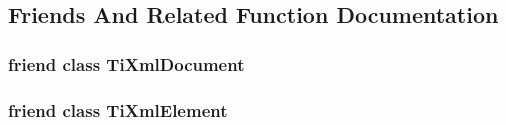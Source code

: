 \subsection{Friends And Related Function Documentation}
\hypertarget{class_ti_xml_node_a173617f6dfe902cf484ce5552b950475}{
\subsubsection[{Ti\+Xml\+Document}]{\setlength{\rightskip}{0pt plus 5cm}friend class {\bf Ti\+Xml\+Document}\hspace{0.3cm}{\ttfamily [friend]}}}\label{class_ti_xml_node_a173617f6dfe902cf484ce5552b950475}
\hypertarget{class_ti_xml_node_ab6592e32cb9132be517cc12a70564c4b}{
\subsubsection[{Ti\+Xml\+Element}]{\setlength{\rightskip}{0pt plus 5cm}friend class {\bf Ti\+Xml\+Element}\hspace{0.3cm}{\ttfamily [friend]}}}\label{class_ti_xml_node_ab6592e32cb9132be517cc12a70564c4b}


